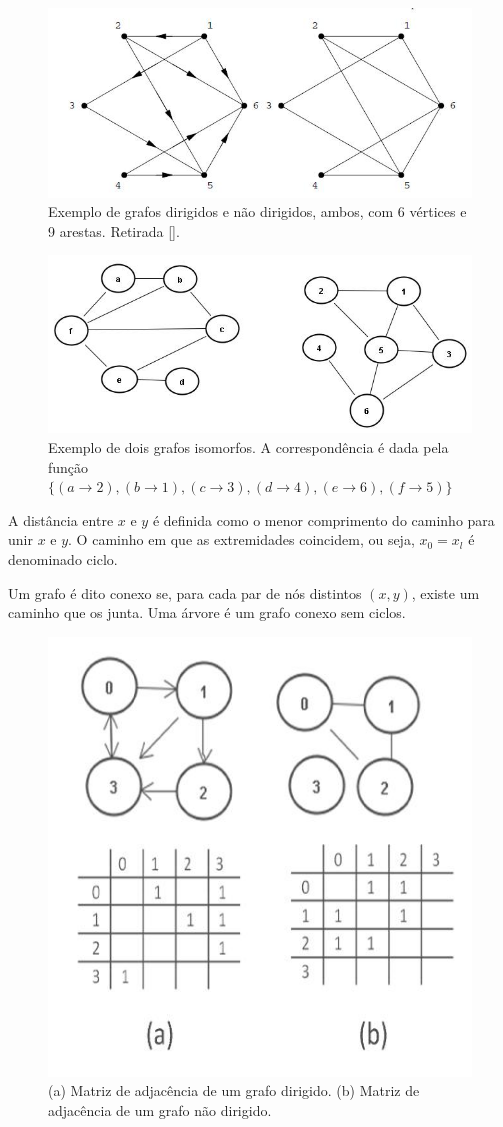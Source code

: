 \documentclass[brazil,ruledheader]{abnt}
\renewcommand{\cite}[1]{[\citeonline{#1}]}
\begin{document}
\begin{figure}[!h]
 \centering
\includegraphics[width= 0.9 \linewidth]{Figuras/figura3.jpg}
\caption[Exemplo de grafos dirigidos e não dirigidos]{Exemplo de grafos
dirigidos e não dirigidos, ambos, com 6 vértices e
9 arestas. Retirada \cite{KlGo06}.}
\label{fig:ExemploGrafos}
\end{figure}

\begin{figure}[htb]
 \centering
\includegraphics[width= 0.9 \linewidth]{Figuras/figura4.jpg}
\caption [Exemplo de dois grafos isomorfos]{Exemplo de dois grafos isomorfos. A
correspondência é dada pela função
$\{(a \rightarrow 2),(b \rightarrow 1),(c \rightarrow 3),(d\rightarrow
4),(e \rightarrow 6),(f \rightarrow 5)\}$}
\label{fig:ExemploGrafosIsomorfos}
\end{figure}

 A distância entre $x$ e $y$ é definida como o menor comprimento do caminho
para unir $x$ e $y$. O caminho em que as extremidades coincidem, ou seja, $x_0 =
x_l$ é denominado ciclo.

Um grafo é dito conexo se, para cada par de nós distintos $(x, y)$, existe um
caminho que os junta.  Uma árvore é um grafo conexo
sem ciclos.

\begin{figure}[!h]
 \centering
\includegraphics[width= 0.4 \linewidth]{Figuras/figura6.jpg}
\caption[Matriz de adjacência] {(a) Matriz de adjacência de um grafo dirigido.
(b) Matriz de adjacência de um grafo não dirigido.}
\label{fig:ExemploGrafoDirigido}
\end{figure}
\end{document}
